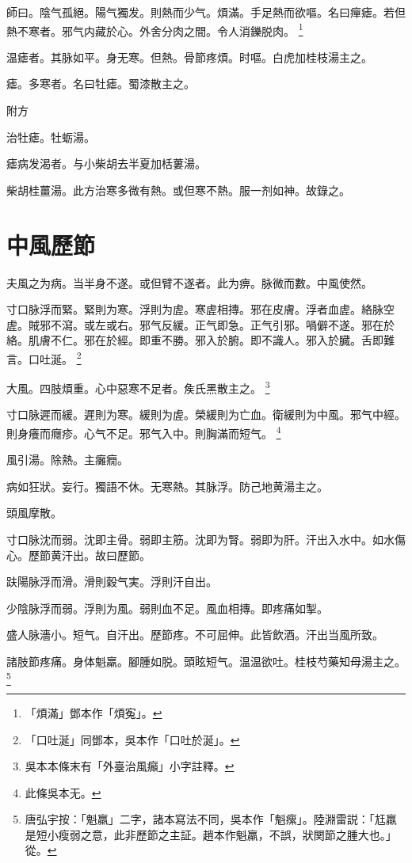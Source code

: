 師曰。陰气孤絕。陽气獨发。則熱而少气。煩滿。手足熱而欲嘔。名曰癉瘧。若但熱不寒者。邪气内藏於心。外舍分肉之間。令人消鑠脱肉。
	\footnote{
		「煩滿」鄧本作「煩寃」。
	}

温瘧者。其脉如平。身无寒。但熱。骨節疼煩。时嘔。白虎加桂枝湯主之。

瘧。多寒者。名曰牡瘧。蜀漆散主之。

附方

治牡瘧。牡蛎湯。

瘧病发渴者。与小柴胡去半夏加栝蔞湯。

柴胡桂薑湯。{\scriptsize 此方治寒多微有熱。或但寒不熱。服一剂如神。故錄之。}

\chapter{中風歷節}


夫風之为病。当半身不遂。或但臂不遂者。此为痹。脉微而數。中風使然。

寸口脉浮而緊。緊則为寒。浮則为虗。寒虗相摶。邪在皮膚。浮者血虗。絡脉空虗。賊邪不瀉。或左或右。邪气反緩。正气即急。正气引邪。喎僻不遂。邪在於絡。肌膚不仁。邪在於經。即重不勝。邪入於腑。即不識人。邪入於臓。舌即難言。口吐涎。
	\footnote{
		「口吐涎」同鄧本，吳本作「口吐於涎」。
	}

大風。四肢煩重。心中惡寒不足者。矦氏黑散主之。
	\footnote{
		吳本本條末有「外臺治風癲」小字註釋。
	}

寸口脉遲而緩。遲則为寒。緩則为虗。榮緩則为亡血。衛緩則为中風。邪气中經。則身癢而癮疹。心气不足。邪气入中。則胸滿而短气。
	\footnote{
		此條吳本无。
	}

風引湯。除熱。主癱癇。

病如狂狀。妄行。獨語不休。无寒熱。其脉浮。防己地黄湯主之。


頭風摩散。

寸口脉沈而弱。沈即主骨。弱即主筋。沈即为腎。弱即为肝。汗出入水中。如水傷心。歷節黄汗出。故曰歷節。

趺陽脉浮而滑。滑則穀气実。浮則汗自出。

少陰脉浮而弱。浮則为風。弱則血不足。風血相摶。即疼痛如掣。

盛人脉濇小。短气。自汗出。歷節疼。不可屈伸。此皆飲酒。汗出当風所致。

諸肢節疼痛。身体魁羸。腳腫如脱。頭眩短气。温温欲吐。桂枝芍藥知母湯主之。
	\footnote{
		唐弘宇按：「魁羸」二字，諸本寫法不同，吳本作「魁瘰」。陸淵雷説：「尪羸是短小瘦弱之意，此非歷節之主証。趙本作魁羸，不誤，狀関節之腫大也。」從。
	}

